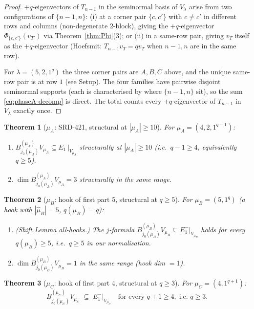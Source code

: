 \documentclass[11pt]{article}
\newtheorem{theorem}{Theorem}
\theoremstyle{definition}
\begin{document}
\begin{proof}
$+q$-eigenvectors of $T_{n-1}$ in the seminormal basis of $V_\lambda$
arise from two configurations of $\{n-1, n\}$:
(i) at a corner pair $\{c, c'\}$ with $c \ne c'$ in different rows and
columns (non-degenerate $2$-block), giving the
$+q$-eigenvector $\Phi_{\{c, c'\}}(v_{T'})$ via Theorem~\ref{thm:Phi}(3);
or (ii) in a same-row pair, giving $v_T$ itself as the
$+q$-eigenvector (Hoefsmit: $T_{n-1} v_T = q v_T$ when $n-1, n$ are in
the same row).

For $\lambda = (5, 2, 1^q)$ the three corner pairs are $A, B, C$
above, and the unique same-row pair is at row $1$ (see Setup).
The four families have pairwise disjoint seminormal supports (each is
characterised by where $\{n-1, n\}$ sit), so the sum
\eqref{eq:phaseA-decomp} is direct. The total counts every
$+q$-eigenvector of $T_{n-1}$ in $V_\lambda$ exactly once.
\end{proof}

\begin{theorem}[$\mu_A$: SRD-421, structural at $|\mu_A| \ge 10$]\label{thm:muA}
For $\mu_A = (4, 2, 1^{q-1})$:
\begin{enumerate}[leftmargin=2em,topsep=0.2em,itemsep=0.1em]
\item $B^{(\mu_A)}_{j_0(\mu_A)} V_{\mu_A} \subseteq E_1^-|_{V_{\mu_A}}$
\emph{structurally} at $|\mu_A| \ge 10$ (i.e.\ $q - 1 \ge 4$,
equivalently $q \ge 5$).
\item $\dim B^{(\mu_A)}_{j_0(\mu_A)} V_{\mu_A} = 3$ \emph{structurally}
in the same range.
\end{enumerate}
\end{theorem}

\begin{theorem}[$\mu_B$: hook of first part $5$, structural at $q \ge 5$]\label{thm:muB}
For $\mu_B = (5, 1^q)$ (a hook with $|\hat\mu_B| = 5$,
$q(\mu_B) = q$):
\begin{enumerate}[leftmargin=2em,topsep=0.2em,itemsep=0.1em]
\item \emph{(Shift Lemma all-hooks.)} The $j$-formula
$B^{(\mu_B)}_{j_0(\mu_B)} V_{\mu_B} \subseteq E_1^-|_{V_{\mu_B}}$
holds for every $q(\mu_B) \ge 5$, i.e.\ $q \ge 5$ in our normalisation.
\item $\dim B^{(\mu_B)}_{j_0(\mu_B)} V_{\mu_B} = 1$ in the same range
(hook dim $= 1$).
\end{enumerate}
\end{theorem}

\begin{theorem}[$\mu_C$: hook of first part $4$, structural at $q \ge 3$]\label{thm:muC}
For $\mu_C = (4, 1^{q+1})$:
\[
   B^{(\mu_C)}_{j_0(\mu_C)} V_{\mu_C} \;\subseteq\; E_1^-|_{V_{\mu_C}}
   \quad\text{for every } q + 1 \ge 4,\; \text{i.e.\ } q \ge 3.
\]
\end{theorem}
\end{document}
